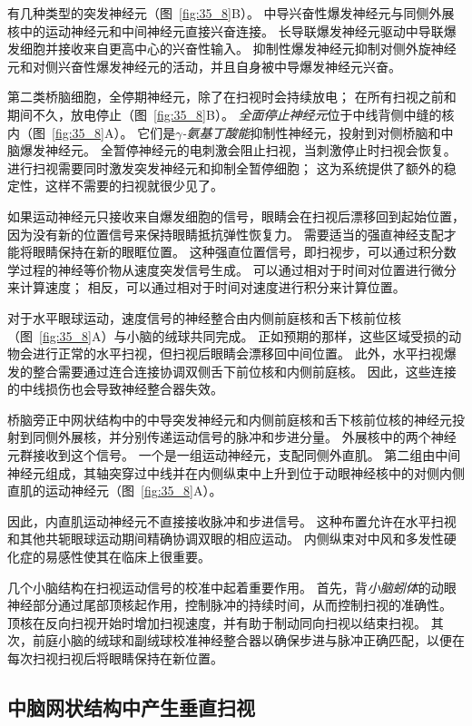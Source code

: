 有几种类型的突发神经元（图~\ref{fig:35_8}B）。
中导兴奋性爆发神经元与同侧外展核中的运动神经元和中间神经元直接兴奋连接。
长导联爆发神经元驱动中导联爆发细胞并接收来自更高中心的兴奋性输入。
抑制性爆发神经元抑制对侧外旋神经元和对侧兴奋性爆发神经元的活动，并且自身被中导爆发神经元兴奋。


第二类桥脑细胞，全停期神经元，除了在扫视时会持续放电；
在所有扫视之前和期间不久，放电停止（图~\ref{fig:35_8}B）。
\textit{全面停止神经元}位于中线背侧中缝的核内（图~\ref{fig:35_8}A）。
它们是\textit{$ \gamma $-氨基丁酸能}抑制性神经元，投射到对侧桥脑和中脑爆发神经元。
全暂停神经元的电刺激会阻止扫视，当刺激停止时扫视会恢复。
进行扫视需要同时激发突发神经元和抑制全暂停细胞；
这为系统提供了额外的稳定性，这样不需要的扫视就很少见了。


如果运动神经元只接收来自爆发细胞的信号，眼睛会在扫视后漂移回到起始位置，因为没有新的位置信号来保持眼睛抵抗弹性恢复力。
需要适当的强直神经支配才能将眼睛保持在新的眼眶位置。
这种强直位置信号，即扫视步，可以通过积分数学过程的神经等价物从速度突发信号生成。
可以通过相对于时间对位置进行微分来计算速度；
相反，可以通过相对于时间对速度进行积分来计算位置。


对于水平眼球运动，速度信号的神经整合由内侧前庭核和舌下核前位核（图~\ref{fig:35_8}A）与小脑的绒球共同完成。
正如预期的那样，这些区域受损的动物会进行正常的水平扫视，但扫视后眼睛会漂移回中间位置。
此外，水平扫视爆发的整合需要通过连合连接协调双侧舌下前位核和内侧前庭核。
因此，这些连接的中线损伤也会导致神经整合器失效。


桥脑旁正中网状结构中的中导突发神经元和内侧前庭核和舌下核前位核的神经元投射到同侧外展核，并分别传递运动信号的脉冲和步进分量。
外展核中的两个神经元群接收到这个信号。
一个是一组运动神经元，支配同侧外直肌。
第二组由中间神经元组成，其轴突穿过中线并在内侧纵束中上升到位于动眼神经核中的对侧内侧直肌的运动神经元（图~\ref{fig:35_8}A）。


因此，内直肌运动神经元不直接接收脉冲和步进信号。
这种布置允许在水平扫视和其他共轭眼球运动期间精确协调双眼的相应运动。
内侧纵束对中风和多发性硬化症的易感性使其在临床上很重要。


几个小脑结构在扫视运动信号的校准中起着重要作用。
首先，背\textit{小脑蚓体}的动眼神经部分通过尾部顶核起作用，控制脉冲的持续时间，从而控制扫视的准确性。
顶核在反向扫视开始时增加扫视速度，并有助于制动同向扫视以结束扫视。
其次，前庭小脑的绒球和副绒球校准神经整合器以确保步进与脉冲正确匹配，以便在每次扫视扫视后将眼睛保持在新位置。



\subsection{中脑网状结构中产生垂直扫视}

